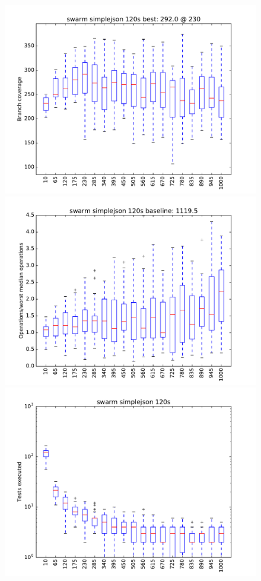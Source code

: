 \begin{figure}
\includegraphics[width=\columnwidth]{graphs/simplejsonswarm120}
\includegraphics[width=\columnwidth]{graphs/opssimplejsonswarm120}
\includegraphics[width=\columnwidth]{graphs/execsimplejsonswarm120}
\end{figure}


